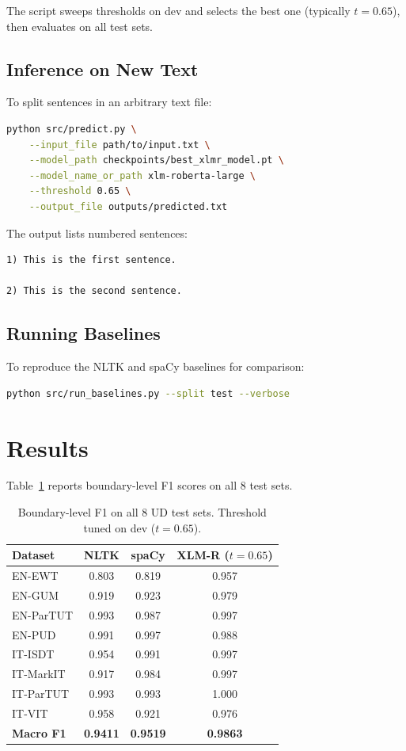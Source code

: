 \documentclass[11pt,a4paper]{article}
\begin{document}
The script sweeps thresholds on dev and selects the best one (typically $t{=}0.65$),
then evaluates on all test sets.

\subsection{Inference on New Text}

To split sentences in an arbitrary text file:

\begin{lstlisting}[language=bash]
python src/predict.py \
    --input_file path/to/input.txt \
    --model_path checkpoints/best_xlmr_model.pt \
    --model_name_or_path xlm-roberta-large \
    --threshold 0.65 \
    --output_file outputs/predicted.txt
\end{lstlisting}

The output lists numbered sentences:

\begin{lstlisting}
1) This is the first sentence.

2) This is the second sentence.
\end{lstlisting}

\subsection{Running Baselines}

To reproduce the NLTK and spaCy baselines for comparison:

\begin{lstlisting}[language=bash]
python src/run_baselines.py --split test --verbose
\end{lstlisting}

\section{Results}

Table~\ref{tab:results} reports boundary-level F1 scores on all 8 test sets.

\begin{table}[h]
\centering
\small
\begin{tabular}{lccc}
\toprule
\textbf{Dataset} & \textbf{NLTK} & \textbf{spaCy} & \textbf{XLM-R} ($t{=}0.65$) \\
\midrule
EN-EWT     & 0.803 & 0.819 & 0.957 \\
EN-GUM     & 0.919 & 0.923 & 0.979 \\
EN-ParTUT  & 0.993 & 0.987 & 0.997 \\
EN-PUD     & 0.991 & 0.997 & 0.988 \\
IT-ISDT    & 0.954 & 0.991 & 0.997 \\
IT-MarkIT  & 0.917 & 0.984 & 0.997 \\
IT-ParTUT  & 0.993 & 0.993 & 1.000 \\
IT-VIT     & 0.958 & 0.921 & 0.976 \\
\midrule
\textbf{Macro F1} & \textbf{0.9411} & \textbf{0.9519} & \textbf{0.9863} \\
\bottomrule
\end{tabular}
\caption{Boundary-level F1 on all 8 UD test sets. Threshold tuned on dev ($t{=}0.65$).}
\label{tab:results}
\end{table}
\end{document}
